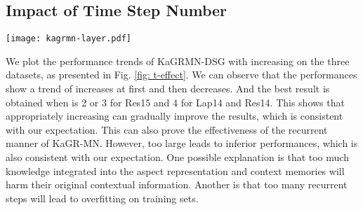 \subsection{Impact of Time Step Number  }
\begin{figure*}[th]
 \centering
 \texttt{[image: kagrmn-layer.pdf]}
 \caption{Impact of the time step number }
 \label{fig: t-effect}
\end{figure*}
We plot the performance trends of KaGRMN-DSG with increasing  on the three datasets, as presented in Fig. \ref{fig: t-effect}.
We can observe that the performances show a trend of increases at first and then decreases.
And the best result is obtained when  is 2 or 3 for Res15 and 4 for Lap14 and Res14.
This shows that appropriately increasing  can gradually improve the results, which is consistent with our expectation.
This can also prove the effectiveness of the recurrent manner of KaGR-MN.
However, too large  leads to inferior performances, which is also consistent with our expectation. One possible explanation is that too much knowledge integrated into the aspect representation and context memories will harm their original contextual information.
Another is that too many recurrent steps will lead to overfitting on training sets.
